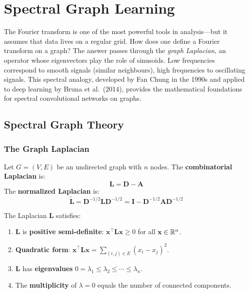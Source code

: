 \chapter{Spectral Graph Learning}
\label{ch:spectral}

The Fourier transform is one of the most powerful tools in analysis---but it assumes that data lives on a regular grid. How does one define a Fourier transform on a graph? The answer passes through the \emph{graph Laplacian}, an operator whose eigenvectors play the role of sinusoids. Low frequencies correspond to smooth signals (similar neighbours), high frequencies to oscillating signals. This spectral analogy, developed by Fan Chung in the 1990s and applied to deep learning by Bruna et al.\ (2014), provides the mathematical foundations for spectral convolutional networks on graphs.

\section{Spectral Graph Theory}

\subsection{The Graph Laplacian}

\begin{definition}
Let $G = (V, E)$ be an undirected graph with $n$ nodes. The \textbf{combinatorial
Laplacian} is:
\[
    \mathbf{L} = \mathbf{D} - \mathbf{A}
\]
The \textbf{normalized Laplacian} is:
\[
    \tilde{\mathbf{L}} = \mathbf{D}^{-1/2}\mathbf{L}\mathbf{D}^{-1/2}
    = \mathbf{I} - \mathbf{D}^{-1/2}\mathbf{A}\mathbf{D}^{-1/2}
\]
\end{definition}

\begin{theorem}
The Laplacian $\mathbf{L}$ satisfies:
\begin{enumerate}
    \item $\mathbf{L}$ is \textbf{positive semi-definite}: $\mathbf{x}^\top \mathbf{L} \mathbf{x} \geq 0$
          for all $\mathbf{x} \in \mathbb{R}^n$.
    \item \textbf{Quadratic form}:
          $\mathbf{x}^\top \mathbf{L} \mathbf{x} = \sum_{(i,j) \in E} (x_i - x_j)^2$.
    \item $\mathbf{L}$ has \textbf{eigenvalues} $0 = \lambda_1 \leq \lambda_2 \leq \cdots \leq \lambda_n$.
    \item The \textbf{multiplicity} of $\lambda = 0$ equals the number of
          connected components.
\end{enumerate}
\end{theorem}

